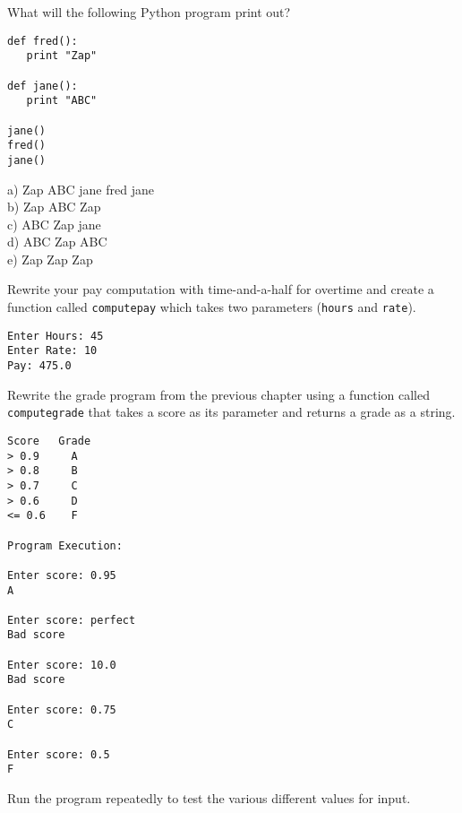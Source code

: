 \begin{ex}
What will the following Python program print out?

\beforeverb
\begin{verbatim}
def fred():
   print "Zap"

def jane():
   print "ABC"

jane()
fred()
jane()
\end{verbatim}
\afterverb
%
a) Zap ABC jane fred jane\\
b) Zap ABC Zap\\
c) ABC Zap jane\\
d) ABC Zap ABC\\
e) Zap Zap Zap
\end{ex}

\begin{ex}
Rewrite your pay computation with time-and-a-half for overtime
and create a function called {\tt computepay} which takes
two parameters ({\tt hours} and {\tt rate}).

\begin{verbatim}
Enter Hours: 45
Enter Rate: 10
Pay: 475.0
\end{verbatim}
\end{ex}

\begin{ex}
Rewrite the grade program from the previous chapter 
using a function called {\tt computegrade} that takes
a score as its parameter and returns a grade as a string.

\begin{verbatim}
Score   Grade
> 0.9     A
> 0.8     B
> 0.7     C
> 0.6     D
<= 0.6    F

Program Execution:

Enter score: 0.95
A

Enter score: perfect
Bad score

Enter score: 10.0
Bad score

Enter score: 0.75
C

Enter score: 0.5
F
\end{verbatim}

Run the program repeatedly to test the various different values
for input.
\end{ex}


